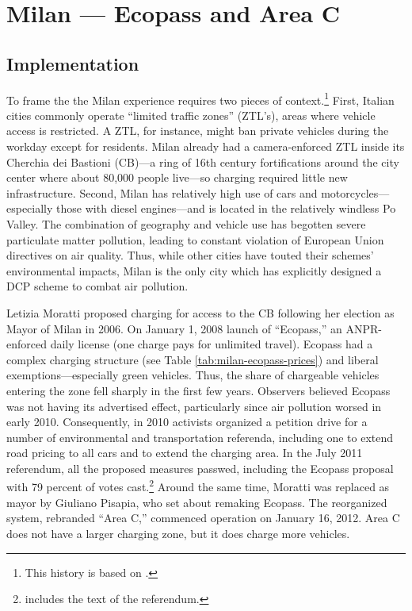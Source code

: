 \section{Milan --- Ecopass and Area C}\label{sec:milan}

\subsection{Implementation}

To frame the the Milan experience requires two pieces of context.\footnote{This history is based on \citet{Mattioli2012}.} First, Italian cities commonly operate ``limited traffic zones'' (ZTL's), areas where vehicle access is restricted. A ZTL, for instance, might ban private vehicles during the workday except for residents. Milan already had a camera-enforced ZTL inside its Cherchia dei Bastioni (CB)---a ring of 16th century fortifications around the city center where about 80,000 people live---so charging required little new infrastructure. Second, Milan has relatively high use of cars and motorcycles---especially those with diesel engines---and is located in the relatively windless Po Valley. The combination of geography and vehicle use has begotten severe particulate matter pollution, leading to constant violation of European Union directives on air quality. Thus, while other cities have touted their schemes' environmental impacts, Milan is the only city which has explicitly designed a DCP scheme to combat air pollution.

 Letizia Moratti proposed charging for access to the CB following her election as Mayor of Milan in 2006. On January 1, 2008 launch of ``Ecopass,'' an ANPR-enforced daily license (one charge pays for unlimited travel). Ecopass had a complex charging structure (see Table \ref{tab:milan-ecopass-prices}) and liberal exemptions---especially green vehicles. Thus, the share of chargeable vehicles entering the zone fell sharply in the first few years. Observers believed Ecopass was not having its advertised effect, particularly since air pollution worsed in early 2010. Consequently, in 2010 activists organized a petition drive for a number of environmental and transportation referenda, including one to extend road pricing to all cars and to extend the charging area. In the July 2011 referendum, all the proposed measures passwed, including the Ecopass proposal with 79 percent of votes cast.\footnote{\citet{Beria2015} includes the text of the referendum.} Around the same time, Moratti was replaced as mayor by Giuliano Pisapia, who set about remaking Ecopass. The reorganized system, rebranded ``Area C,'' commenced operation on January 16, 2012. Area C does not have a larger charging zone, but it does charge more vehicles.

